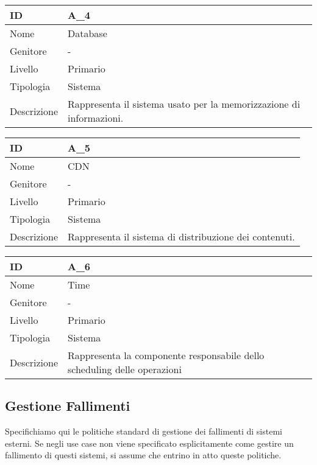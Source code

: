 \begin{center}
\begin{tabular}{ |p{2cm}|p{10cm}|  }
\hline
ID & A\_4 \\\hline
Nome & Database\\\hline
Genitore & - \\\hline
Livello &  Primario \\\hline
Tipologia & Sistema \\\hline
Descrizione &  Rappresenta il sistema usato per la memorizzazione di informazioni. \\\hline
\end{tabular}
\label{table_attore:4}\newline

\begin{tabular}{ |p{2cm}|p{10cm}|  }
\hline
ID & A\_5 \\\hline
Nome & CDN\\\hline
Genitore & - \\\hline
Livello &  Primario \\\hline
Tipologia & Sistema \\\hline
Descrizione &  Rappresenta il sistema di distribuzione dei contenuti. \\\hline
\end{tabular}
\label{table_attore:5}\newline

\begin{tabular}{ |p{2cm}|p{10cm}|  }
\hline
ID & A\_6 \\\hline
Nome & Time\\\hline
Genitore & - \\\hline
Livello &  Primario \\\hline
Tipologia & Sistema \\\hline
Descrizione &  Rappresenta la componente responsabile dello scheduling delle operazioni \\\hline
\end{tabular}
\label{table_attore:6}\newline


\end{center}

\subsection{Gestione Fallimenti}
Specifichiamo qui le politiche standard di gestione dei fallimenti di sistemi esterni. Se negli use case non viene specificato esplicitamente come gestire un fallimento di questi sistemi, si assume che entrino in atto queste politiche.

